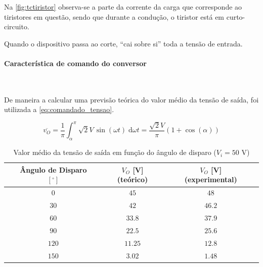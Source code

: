 \documentclass[a4paper,11pt]{article}
\numberwithin{equation}{section}
\begin{document}
Na \autoref{fig:tctiristor} observa-se a parte da corrente da carga que corresponde ao tiristores em questão, sendo que durante a condução, o tiristor está em curto-circuito.

Quando o dispositivo passa ao corte, ``cai sobre si'' toda a tensão de entrada.

\paragraph{Característica de comando do conversor} \mbox{}\

De maneira a calcular uma previsão teórica do valor médio da tensão de saída, foi utilizada a \autoref{eq:comandado_tensao}.

\begin{equation}
\label{eq:comandado_tensao}
\overline{v_O}=\frac{1}{\pi} \int_\alpha^\pi \sqrt{2} V \,\sin{(\omega t)}\;\mathrm{d}\omega t = \frac{\sqrt{2}V}{\pi}(1 + \cos{(\alpha)})
\end{equation}

\begin{table}[H]
\centering
\begin{tabular}{c c c c c c c}
\hfil & Ângulo de Disparo $[^\circ]$ & \hfil & $V_O$ [V] (teórico) & \hfil & $V_O$ [V] (experimental) & \hfil \\
\hline
			&$0$&	&$45$&		&$48$&\\
\rowcolor{SkyBlue}	&$30$&	&$42$&		&$46.2$&\\
			&$60$&	&$33.8$&	&$37.9$&\\
\rowcolor{SkyBlue}	&$90$&	&$22.5$&	&$25.6$&\\
			&$120$&	&$11.25$&	&$12.8$&\\
\rowcolor{SkyBlue}	&$150$&	&$3.02$&	&$1.48$&\\
\hline
\end{tabular}
\caption{Valor médio da tensão de saída em função do ângulo de disparo ($V_i = 50$ V)}
\label{tab:akpk}
\end{table}
\end{document}
